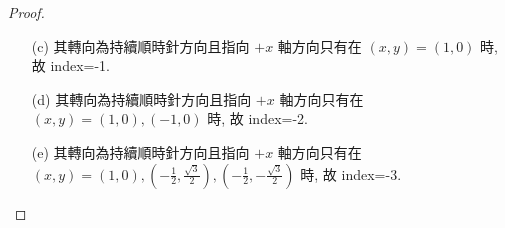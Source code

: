 \documentclass[10pt,a4paper]{article}
\begin{document}
\begin{proof}
\begin{enumerate}
\item[(c)]
其轉向為持續順時針方向且指向 $+x$ 軸方向只有在 $(x,y)=(1,0)$ 時, 故 index=-1.\\
\item[(d)]
其轉向為持續順時針方向且指向 $+x$ 軸方向只有在 $(x,y)=(1,0), (-1,0)$ 時, 故 index=-2.\\
\item[(e)]
其轉向為持續順時針方向且指向 $+x$ 軸方向只有在 $(x,y)=(1,0), (-\frac{1}{2},\frac{\sqrt{3}}{2}), (-\frac{1}{2},-\frac{\sqrt{3}}{2})$ 時, 故 index=-3.\\

\end{enumerate}
\end{proof}
\end{document}
